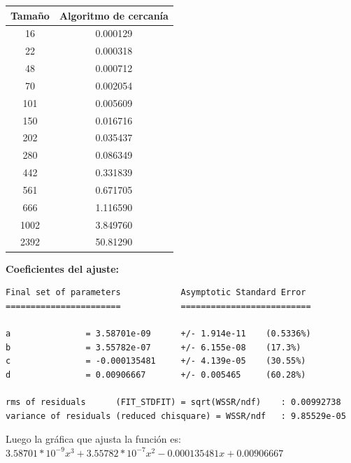 \documentclass[a4]{article}
\begin{document}
\begin{tabular}{|c|c|} \hline
\textbf{Tamaño}& 
\textbf{Algoritmo de cercanía}
  \\ \hline
     16      & 0.000129  \\
     22      & 0.000318  \\
     48      & 0.000712  \\
     70      & 0.002054  \\
     101     & 0.005609            \\
     150     & 0.016716  \\
     202     & 0.035437  \\
     280     & 0.086349    \\
     442     & 0.331839    \\
     561     & 0.671705  \\
     666     & 1.116590       \\
     1002    & 3.849760  \\
     2392    & 50.81290   \\
\hline
\end{tabular}

\vspace{5mm}
\textbf{Coeficientes del ajuste:}
\begin{verbatim}
Final set of parameters            Asymptotic Standard Error
=======================            ==========================

a               = 3.58701e-09      +/- 1.914e-11    (0.5336%)
b               = 3.55782e-07      +/- 6.155e-08    (17.3%)
c               = -0.000135481     +/- 4.139e-05    (30.55%)
d               = 0.00906667       +/- 0.005465     (60.28%)

rms of residuals      (FIT_STDFIT) = sqrt(WSSR/ndf)    : 0.00992738
variance of residuals (reduced chisquare) = WSSR/ndf   : 9.85529e-05
\end{verbatim}

\vspace{5mm}
Luego la gráfica que ajusta la función es:  $3.58701*10^{-9}x^3 + 3.55782*10^{-7}x^2 - 0.000135481x + 0.00906667$ 

\begin{figure}[H]
  \centering
{}
\end{figure}
\end{document}
